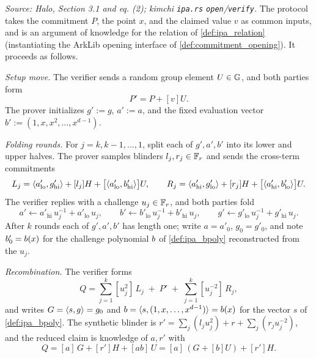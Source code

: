 \begin{definition}[IPA opening protocol]
  \textit{Source: Halo, Section 3.1 and eq. (2); kimchi \texttt{ipa.rs}
  \texttt{open}/\texttt{verify}.}
  The protocol takes the commitment \(P\), the point \(x\), and the claimed
  value \(v\) as common inputs, and is an argument of knowledge for the relation
  of \cref{def:ipa_relation} (instantiating the ArkLib opening interface of
  \cref{def:commitment_opening}). It proceeds as follows.

  \emph{Setup move.} The verifier sends a random group element \(U \in \mathbb{G}\), and
  both parties form
  \[
    P' = P + [v]U.
  \]
  The prover initializes \(g' := g\), \(a' := a\), and the fixed evaluation
  vector \(b' := (1, x, x^{2}, \dots, x^{d-1})\).

  \emph{Folding rounds.} For \(j = k, k-1, \dots, 1\), split each of
  \(g', a', b'\) into its lower and upper halves. The prover samples blinders
  \(l_{j}, r_{j} \in \mathbb{F}_r\) and sends the cross-term commitments
  \[
    L_{j} = \langle a'_{\mathrm{lo}}, g'_{\mathrm{hi}} \rangle + [l_{j}]H
      + \bigl[\langle a'_{\mathrm{lo}}, b'_{\mathrm{hi}} \rangle\bigr]U,
    \qquad
    R_{j} = \langle a'_{\mathrm{hi}}, g'_{\mathrm{lo}} \rangle + [r_{j}]H
      + \bigl[\langle a'_{\mathrm{hi}}, b'_{\mathrm{lo}} \rangle\bigr]U.
  \]
  The verifier replies with a challenge \(u_{j} \in \mathbb{F}_r\), and both parties fold
  \[
    a' \leftarrow a'_{\mathrm{hi}}\, u_{j}^{-1} + a'_{\mathrm{lo}}\, u_{j},
    \qquad
    b' \leftarrow b'_{\mathrm{lo}}\, u_{j}^{-1} + b'_{\mathrm{hi}}\, u_{j},
    \qquad
    g' \leftarrow g'_{\mathrm{lo}}\, u_{j}^{-1} + g'_{\mathrm{hi}}\, u_{j}.
  \]
  After \(k\) rounds each of \(g', a', b'\) has length one; write
  \(a = a'_{0}\), \(g_{0} = g'_{0}\), and note \(b'_{0} = b(x)\) for the
  challenge polynomial \(b\) of \cref{def:ipa_bpoly} reconstructed from the
  \(u_{j}\).

  \emph{Recombination.} The verifier forms
  \[
    Q = \sum_{j=1}^{k} [u_{j}^{2}]\, L_{j} \;+\; P' \;+\;
        \sum_{j=1}^{k} [u_{j}^{-2}]\, R_{j},
  \]
  and writes \(G = \langle s, g \rangle = g_{0}\) and \(b = \langle s, (1, x, \dots,
  x^{d-1}) \rangle = b(x)\) for the vector \(s\) of \cref{def:ipa_bpoly}. The
  synthetic blinder is
  \(r' = \sum_{j} (l_{j} u_{j}^{2}) + r + \sum_{j} (r_{j} u_{j}^{-2})\), and the
  reduced claim is knowledge of \(a, r'\) with
  \[
    Q = [a]\,G + [r']H + [a b]\,U = [a]\,(G + [b]U) + [r']H.
  \]


\end{definition}
